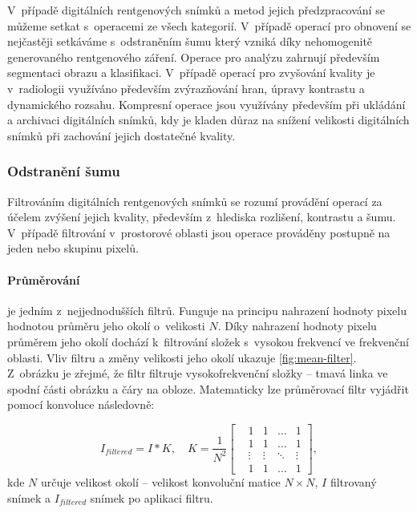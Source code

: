 V~případě digitálních rentgenových snímků a metod jejich předzpracování se můžeme setkat s~operacemi ze všech kategorií. V~případě operací pro obnovení se nejčastěji setkáváme s~odstraněním šumu který vzniká díky nehomogenitě generovaného rentgenového záření. Operace pro analýzu zahrnují především segmentaci obrazu a klasifikaci. V~případě operací pro zvyšování kvality je v~radiologii využíváno především zvýrazňování hran, úpravy kontrastu a dynamického rozsahu. Kompresní operace jsou využívány především při ukládání a archivaci digitálních snímků, kdy je kladen důraz na snížení velikosti digitálních snímků při zachování jejich dostatečné kvality.

\subsubsection{Odstranění šumu}
Filtrováním digitálních rentgenových snímků se rozumí provádění operací za účelem zvýšení jejich kvality, především z~hlediska rozlišení, kontrastu a šumu. V~případě filtrování v~prostorové oblasti jsou operace prováděny postupně na jeden nebo skupinu pixelů. \cite[str.~425]{Diagnostic-Radiology-Physics}
\paragraph{Průměrování}
je jedním z~nejjednodušších filtrů. Funguje na principu nahrazení hodnoty pixelu hodnotou průměru jeho okolí o~velikosti $N$. Díky nahrazení hodnoty pixelu průměrem jeho okolí dochází k~filtrování složek s~vysokou frekvencí ve frekvenční oblasti. Vliv filtru a změny velikosti jeho okolí ukazuje \cref{fig:mean-filter}. Z~obrázku je zřejmé, že filtr filtruje vysokofrekvenční složky -- tmavá linka ve spodní části obrázku a čáry na obloze. Matematicky lze průměrovací filtr vyjádřit pomocí konvoluce následovně:

\begin{equation}
\label{eq:mean1}
I_{filtered} = I \ast K, \quad
K = \frac{1}{N^{2}}\begin{bmatrix}
 &1  &1 &\dots  &1 \\ 
 &1  &1 &\dots  &1 \\ 
 &\vdots  &\vdots &\ddots  &\vdots \\ 
 &1  &1 &\dots  &1 
\end{bmatrix},
\end{equation}
kde $N$ určuje velikost okolí -- velikost konvoluční matice $N\times N$, $I$ filtrovaný snímek a $I_{filtered}$ snímek po aplikaci filtru.

